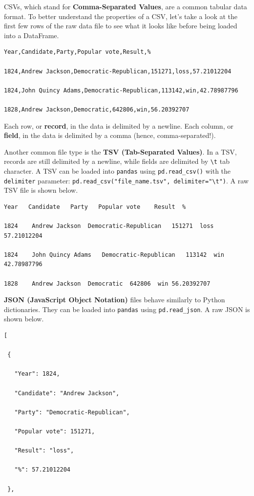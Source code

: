 \documentclass[
  letterpaper,
  DIV=11,
  numbers=noendperiod]{scrreprt}
\begin{document}
CSVs, which stand for \textbf{Comma-Separated Values}, are a common
tabular data format. To better understand the properties of a CSV, let's
take a look at the first few rows of the raw data file to see what it
looks like before being loaded into a DataFrame.

\begin{verbatim}
Year,Candidate,Party,Popular vote,Result,%

1824,Andrew Jackson,Democratic-Republican,151271,loss,57.21012204

1824,John Quincy Adams,Democratic-Republican,113142,win,42.78987796

1828,Andrew Jackson,Democratic,642806,win,56.20392707
\end{verbatim}

Each row, or \textbf{record}, in the data is delimited by a newline.
Each column, or \textbf{field}, in the data is delimited by a comma
(hence, comma-separated!).

Another common file type is the \textbf{TSV (Tab-Separated Values)}. In
a TSV, records are still delimited by a newline, while fields are
delimited by \texttt{\textbackslash{}t} tab character. A TSV can be
loaded into \texttt{pandas} using \texttt{pd.read\_csv()} with the
\texttt{delimiter} parameter:
\texttt{pd.read\_csv("file\_name.tsv",\ delimiter="\textbackslash{}t")}.
A raw TSV file is shown below.

\begin{verbatim}
Year   Candidate   Party   Popular vote    Result  %

1824    Andrew Jackson  Democratic-Republican   151271  loss    57.21012204

1824    John Quincy Adams   Democratic-Republican   113142  win 42.78987796

1828    Andrew Jackson  Democratic  642806  win 56.20392707
\end{verbatim}

\textbf{JSON (JavaScript Object Notation)} files behave similarly to
Python dictionaries. They can be loaded into \texttt{pandas} using
\texttt{pd.read\_json}. A raw JSON is shown below.

\begin{verbatim}
[

 {

   "Year": 1824,

   "Candidate": "Andrew Jackson",

   "Party": "Democratic-Republican",

   "Popular vote": 151271,

   "Result": "loss",

   "%": 57.21012204

 },
\end{verbatim}
\end{document}
